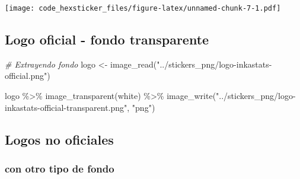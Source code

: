 \documentclass[
]{article}
\newenvironment{Shaded}{\begin{snugshade}}{\end{snugshade}}
\newcommand{\CommentTok}[1]{\textcolor[rgb]{0.56,0.35,0.01}{\textit{#1}}}
\newcommand{\FunctionTok}[1]{\textcolor[rgb]{0.00,0.00,0.00}{#1}}
\newcommand{\NormalTok}[1]{#1}
\newcommand{\OtherTok}[1]{\textcolor[rgb]{0.56,0.35,0.01}{#1}}
\newcommand{\SpecialCharTok}[1]{\textcolor[rgb]{0.00,0.00,0.00}{#1}}
\newcommand{\StringTok}[1]{\textcolor[rgb]{0.31,0.60,0.02}{#1}}
\begin{document}
\texttt{[image: code\_hexsticker\_files/figure-latex/unnamed-chunk-7-1.pdf]}

\hypertarget{logo-oficial---fondo-transparente}{%
\subsection{Logo oficial - fondo
transparente}\label{logo-oficial---fondo-transparente}}

\begin{Shaded}
\begin{Highlighting}[]
\CommentTok{\# Extrayendo fondo}
\NormalTok{logo }\OtherTok{\textless{}{-}} \FunctionTok{image\_read}\NormalTok{(}\StringTok{"../stickers\_png/logo{-}inkastats{-}official.png"}\NormalTok{)}

\NormalTok{logo }\SpecialCharTok{\%\textgreater{}\%} 
  \FunctionTok{image\_transparent}\NormalTok{(}\StringTok{\textquotesingle{}white\textquotesingle{}}\NormalTok{) }\SpecialCharTok{\%\textgreater{}\%} 
  \FunctionTok{image\_write}\NormalTok{(}\StringTok{"../stickers\_png/logo{-}inkastats{-}official{-}transparent.png"}\NormalTok{, }\StringTok{"png"}\NormalTok{)}
\end{Highlighting}
\end{Shaded}

\hypertarget{logos-no-oficiales}{%
\subsection{Logos no oficiales}\label{logos-no-oficiales}}

\hypertarget{con-otro-tipo-de-fondo}{%
\subsubsection{con otro tipo de fondo}\label{con-otro-tipo-de-fondo}}
\end{document}

